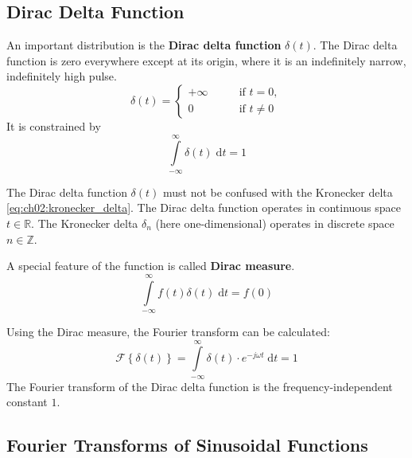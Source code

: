 \begin{refsection}
\subsection{Dirac Delta Function} \label{sec:ch02_dirac_impulse}

An important distribution is the  \textbf{Dirac delta function} $\delta(t)$. The Dirac delta function is zero everywhere except at its origin, where it is an indefinitely narrow, indefinitely high pulse.
\begin{equation}
	\delta(t) = \begin{cases}
		+\infty & \qquad \text{if } t = 0, \\
		0 & \qquad \text{if } t \neq 0
	\end{cases}
	\label{eq:ch02:dirac_delta}
\end{equation}%
%
It is constrained by
\begin{equation}
	\int\limits_{-\infty}^{\infty} \delta(t) \; \mathrm{d} t = 1
\end{equation}

\begin{attention}
	The Dirac delta function $\delta(t)$ must not be confused with the Kronecker delta \eqref{eq:ch02:kronecker_delta}. The Dirac delta function operates in continuous space $t \in \mathbb{R}$. The Kronecker delta $\delta_n$ (here one-dimensional) operates in discrete space $n \in \mathbb{Z}$.
\end{attention}

A special feature of the function is called  \textbf{Dirac measure}.
\begin{equation}
	\int\limits_{-\infty}^{\infty} f(t) \delta(t) \; \mathrm{d} t = f(0)
	\label{eq:ch02:dirac_measure}
\end{equation}

Using the Dirac measure, the Fourier transform can be calculated:
\begin{equation}
	\mathcal{F} \left\{\delta(t)\right\} = \int\limits_{-\infty}^{\infty} \delta(t) \cdot e^{-j \omega t} \; \mathrm{d} t = 1
	\label{eq:ch02:ft_dirac}
\end{equation}
The Fourier transform of the Dirac delta function is the frequency-independent constant $1$.

\subsection{Fourier Transforms of Sinusoidal Functions}


\end{refsection}
